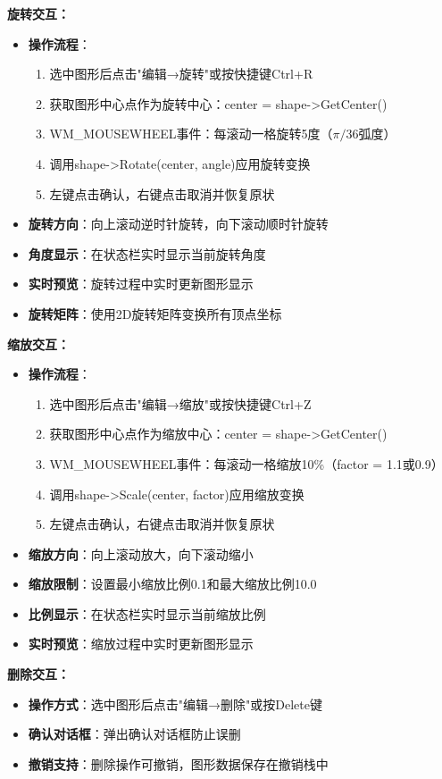 \documentclass[12pt,a4paper]{article}
\begin{document}
\begin{tcolorbox}
\textbf{旋转交互：}
\begin{itemize}
    \item \textbf{操作流程}：
    \begin{enumerate}
        \item 选中图形后点击"编辑→旋转"或按快捷键Ctrl+R
        \item 获取图形中心点作为旋转中心：center = shape->GetCenter()
        \item WM\_MOUSEWHEEL事件：每滚动一格旋转5度（$\pi/36$弧度）
        \item 调用shape->Rotate(center, angle)应用旋转变换
        \item 左键点击确认，右键点击取消并恢复原状
    \end{enumerate}
    \item \textbf{旋转方向}：向上滚动逆时针旋转，向下滚动顺时针旋转
    \item \textbf{角度显示}：在状态栏实时显示当前旋转角度
    \item \textbf{实时预览}：旋转过程中实时更新图形显示
    \item \textbf{旋转矩阵}：使用2D旋转矩阵变换所有顶点坐标
\end{itemize}

\textbf{缩放交互：}
\begin{itemize}
    \item \textbf{操作流程}：
    \begin{enumerate}
        \item 选中图形后点击"编辑→缩放"或按快捷键Ctrl+Z
        \item 获取图形中心点作为缩放中心：center = shape->GetCenter()
        \item WM\_MOUSEWHEEL事件：每滚动一格缩放10\%（factor = 1.1或0.9）
        \item 调用shape->Scale(center, factor)应用缩放变换
        \item 左键点击确认，右键点击取消并恢复原状
    \end{enumerate}
    \item \textbf{缩放方向}：向上滚动放大，向下滚动缩小
    \item \textbf{缩放限制}：设置最小缩放比例0.1和最大缩放比例10.0
    \item \textbf{比例显示}：在状态栏实时显示当前缩放比例
    \item \textbf{实时预览}：缩放过程中实时更新图形显示
\end{itemize}

\textbf{删除交互：}
\begin{itemize}
    \item \textbf{操作方式}：选中图形后点击"编辑→删除"或按Delete键
    \item \textbf{确认对话框}：弹出确认对话框防止误删
    \item \textbf{撤销支持}：删除操作可撤销，图形数据保存在撤销栈中
\end{itemize}


\end{tcolorbox}
\end{document}

